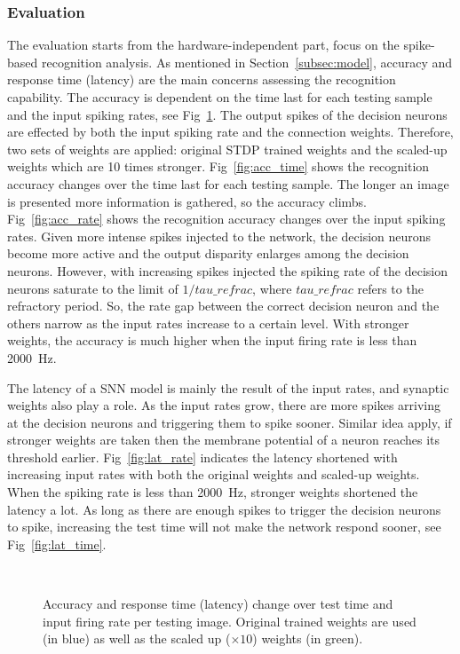 \subsubsection{Evaluation}
The evaluation starts from the hardware-independent part, focus on the spike-based recognition analysis.
As mentioned in Section~\ref{subsec:model}, accuracy and response time (latency) are the main concerns assessing the recognition capability.
The accuracy is dependent on the time last for each testing sample and the input spiking rates, see Fig~\ref{fig:assess}.
The output spikes of the decision neurons are effected by both the input spiking rate and the connection weights.
Therefore, two sets of weights are applied: original STDP trained weights and the scaled-up weights which are 10 times stronger.
Fig~\ref{fig:acc_time} shows the recognition accuracy changes over the time last for each testing sample.
The longer an image is presented more information is gathered, so the accuracy climbs.
Fig~\ref{fig:acc_rate} shows the recognition accuracy changes over the input spiking rates.
Given more intense spikes injected to the network, the decision neurons become more active and the output disparity enlarges among the decision neurons.
However, with increasing spikes injected the spiking rate of the decision neurons saturate to the limit of $1/tau\_refrac$, where $tau\_refrac$ refers to the refractory period.  
So, the rate gap between the correct decision neuron and the others narrow as the input rates increase to a certain level.
With stronger weights, the accuracy is much higher when the input firing rate is less than 2000~Hz.


The latency of a SNN model is mainly the result of the input rates, and synaptic weights also play a role.
As the input rates grow, there are more spikes arriving at the decision neurons and triggering them to spike sooner.
Similar idea apply, if stronger weights are taken then the membrane potential of a neuron reaches its threshold earlier.
Fig~\ref{fig:lat_rate} indicates the latency shortened with increasing input rates with both the original weights and scaled-up weights.
When the spiking rate is less than 2000~Hz, stronger weights shortened the latency a lot.
As long as there are enough spikes to trigger the decision neurons to spike, increasing the test time will not make the network respond sooner, see Fig~\ref{fig:lat_time}.
	\begin{figure}[htb!]
	  \centering
	  	  \\
	  \caption{Accuracy and response time (latency) change over test time and input firing rate per testing image. Original trained weights are used (in blue) as well as the scaled up ($\times10$) weights (in green). }
	  \label{fig:assess}
	\end{figure}

